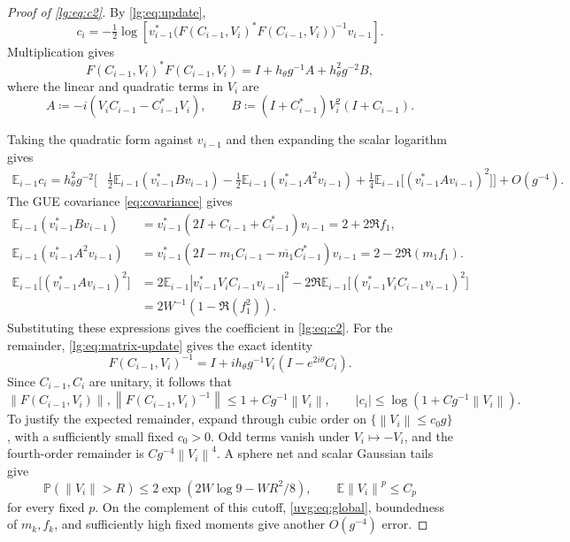 \documentclass[11pt]{article}
\numberwithin{equation}{section}
\theoremstyle{remark}
\newcommand{\E}{\mathbb E}
\newcommand{\Prob}{\mathbb P}
\newcommand{\norm}[1]{\left\|#1\right\|}
\begin{document}
\begin{proof}[Proof of \eqref{lg:eq:c2}]
By \eqref{lg:eq:update},
\[
 c_i=-\tfrac12\log\left[
 v_{i-1}^*\bigl(F(C_{i-1},V_i)^*F(C_{i-1},V_i)\bigr)^{-1}v_{i-1}
 \right].
\]
Multiplication gives
\[
 F(C_{i-1},V_i)^*F(C_{i-1},V_i)
 =I+h_\theta g^{-1}A+h_\theta^2g^{-2}B,
\]
where the linear and quadratic terms in $V_i$ are
\[
 A\coloneqq-i(V_iC_{i-1}-C_{i-1}^*V_i),\qquad
 B\coloneqq(I+C_{i-1}^*)V_i^2(I+C_{i-1}).
\]
 
Taking the quadratic form against $v_{i-1}$ and then expanding the
scalar logarithm gives
\[
 \begin{aligned}
 \E_{i-1}c_i=h_\theta^2g^{-2}\Big[
 &\tfrac12\E_{i-1}(v_{i-1}^*Bv_{i-1})
 -\tfrac12\E_{i-1}(v_{i-1}^*A^2v_{i-1}) +\tfrac14\E_{i-1}\bigl[(v_{i-1}^*Av_{i-1})^2\bigr]\Big]+O(g^{-4}).
 \end{aligned}
\]
The GUE covariance \eqref{eq:covariance} gives
\[
 \begin{aligned}
 \E_{i-1}(v_{i-1}^*Bv_{i-1})
 &=v_{i-1}^*(2I+C_{i-1}+C_{i-1}^*)v_{i-1}
 =2+2\Re f_1,\\
 \E_{i-1}(v_{i-1}^*A^2v_{i-1})
 &=v_{i-1}^*(2I-m_1C_{i-1}-\overline{m_1}C_{i-1}^*)v_{i-1}
 =2-2\Re(m_1f_1).
 \\
 \E_{i-1}\bigl[(v_{i-1}^*Av_{i-1})^2\bigr]
 &=2\E_{i-1}|v_{i-1}^*V_iC_{i-1}v_{i-1}|^2
   -2\Re\E_{i-1}\bigl[(v_{i-1}^*V_iC_{i-1}v_{i-1})^2\bigr]\\
 &=2W^{-1}(1-\Re(f_1^2)).
 \end{aligned}
\]
Substituting these expressions gives the coefficient in \eqref{lg:eq:c2}.
For the remainder, \eqref{lg:eq:matrix-update} gives the exact identity
\[
 F(C_{i-1},V_i)^{-1}
 =I+ih_\theta g^{-1}V_i(I-e^{2i\theta}C_i).
\]
Since $C_{i-1},C_i$ are unitary, it follows that
\begin{equation}\label{uvg:eq:global}
 \norm{F(C_{i-1},V_i)},\norm{F(C_{i-1},V_i)^{-1}}\le1+Cg^{-1}\norm{V_i},\qquad
 |c_i|\le\log(1+Cg^{-1}\norm{V_i}).
\end{equation}
To justify the expected remainder, expand through cubic order on
\(\{\norm{V_i}\le c_0g\}\), with a sufficiently small fixed \(c_0>0\).
Odd terms vanish under \(V_i\mapsto-V_i\), and the fourth-order
remainder is \(Cg^{-4}\norm{V_i}^4\). A sphere net and scalar Gaussian
tails give
\begin{equation}\label{uvg:eq:tail}
 \Prob(\norm{V_i}>R)\le2\exp(2W\log9-WR^2/8),
 \qquad \E\norm{V_i}^p\le C_p
\end{equation}
for every fixed \(p\). On the complement of this cutoff, \eqref{uvg:eq:global},
boundedness of \(m_k,f_k\), and sufficiently high fixed moments
give another \(O(g^{-4})\) error.
\end{proof}
\end{document}
